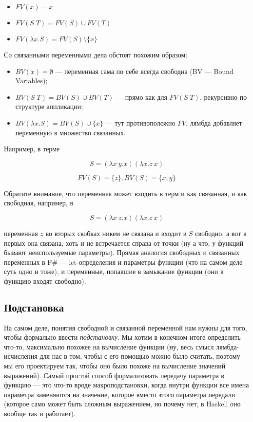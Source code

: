 \documentclass[a5paper]{article}
\begin{document}
\begin{itemize}
    \item $FV(x) = x$
    \item $FV(S \; T) = FV(S) \cup FV(T)$
    \item $FV(\lambda x.S) = FV(S) \setminus \{x\}$
\end{itemize}

Со связанными переменными дела обстоят похожим образом:

\begin{itemize}
    \item $BV(x) = \emptyset$ --- переменная сама по себе всегда свободна (BV --- Bound Variables);
    \item $BV(S \; T) = BV(S) \cup BV(T)$ --- прямо как для $FV(S \; T)$, рекурсивно по структуре аппликации;
    \item $BV(\lambda x.S) = BV(S) \cup \{x\}$ --- тут противоположно $FV$, лямбда добавляет переменную в множество связанных.
\end{itemize}

Например, в терме

$$S = (\lambda x\ y.x) (\lambda x.z\ x)$$

$$FV(S) = \{z\}, BV(S) = \{x,y\}$$

Обратите внимание, что переменная может входить в терм и как связанная, и как свободная, например, в

$$S = (\lambda x\ z.x) (\lambda x.z\ x)$$

переменная $z$ во вторых скобках никем не связана и входит в $S$ свободно, а вот в первых она связана, хоть и не встречается справа от точки (ну а что, у функций бывают неиспользуемые параметры). Прямая аналогия свободных и связанных переменных в F\# --- let-определения и  параметры функции (что на самом деле суть одно и тоже), и переменные, попавшие в замыкание функции (они в функцию входят свободно).

\subsection{Подстановка}

На самом деле, понятия свободной и связанной переменной нам нужны для того, чтобы формально ввести \textit{подстановку}. Мы хотим в конечном итоге определить что-то, максимально похожее на вычисление функции (ну, весь смысл лямбда-исчисления для нас в том, чтобы с его помощью можно было считать, поэтому мы его проектируем так, чтобы оно было похоже на вычисление значений выражений). Самый простой способ формализовать передачу параметра в функцию --- это что-то вроде макроподстановки, когда внутри функции все имена параметра заменяются на значение, которое вместо этого параметра передали (которое само может быть сложным выражением, но почему нет, в Haskell оно вообще так и работает).
\end{document}
